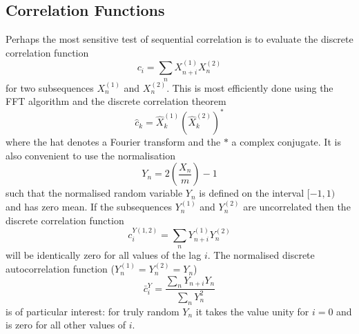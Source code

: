 \documentclass[dvips]{article}
\begin{document}
\subsection*{Correlation Functions}
Perhaps the most sensitive test of sequential correlation is to evaluate
the discrete correlation function
\[
c_{i} = \sum_{n} X^{(1)}_{n+i}X^{(2)}_{n}
\]
for two subsequences $X^{(1)}_{n}$ and $X^{(2)}_{n}$.  This is most efficiently
done using the FFT algorithm and the discrete correlation theorem
\[
\hat{c}_{k} = \hat{X}^{(1)}_{k}\left(\hat{X}^{(2)}_{k}\right)^{*}
\]
where the hat denotes a Fourier transform and the $*$ a complex
conjugate.  It is also convenient to use the normalisation
\[
Y_{n} = 2\left(\frac{X_{n}}{m}\right) -1
\]
such that the normalised random variable $Y_{n}$ is defined on the interval
$[-1,1)$ and has zero mean.  If the subsequences $Y^{(1)}_{n}$ and
$Y^{(2)}_{n}$ are uncorrelated then the discrete correlation function
\[
c^{Y(1,2)}_{i} = \sum_{n} Y^{(1)}_{n+i}Y^{(2)}_{n}
\]
will be identically zero for all values of the lag $i$.  The
normalised discrete autocorrelation function ($Y^{(1)}_{n}=Y^{(2)}_{n}=Y_{n}$)
\[
\bar{c}^{Y}_{i} = \frac{\sum_{n} Y_{n+i}Y_{n}}{\sum_{n} Y^{2}_{n}}
\]
is of particular interest: for truly random $Y_{n}$ it takes the value
unity for $i=0$ and is zero for all other values of $i$.
\end{document}
